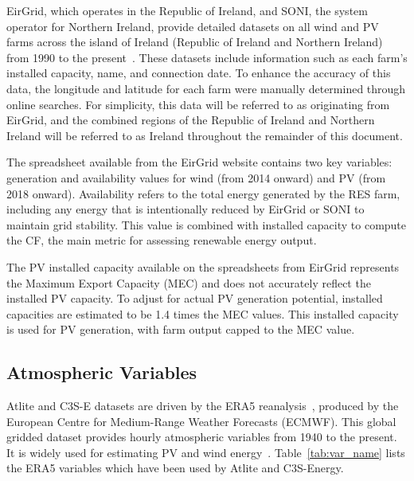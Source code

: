 \documentclass[a4paper, 11pt]{article}
\begin{document}
EirGrid, which operates in the Republic of Ireland, and SONI, the system operator for Northern Ireland, provide detailed datasets on all wind and PV farms across the island of Ireland (Republic of Ireland and Northern Ireland) from 1990 to the present~\cite{eirgrid}. These datasets include information such as each farm’s installed capacity, name, and connection date. To enhance the accuracy of this data, the longitude and latitude for each farm were manually determined through online searches. For simplicity, this data will be referred to as originating from EirGrid, and the combined regions of the Republic of Ireland and Northern Ireland will be referred to as Ireland throughout the remainder of this document.

The spreadsheet available from the EirGrid website contains two key variables: generation and availability values for wind (from 2014 onward) and PV (from 2018 onward). Availability refers to the total energy generated by the RES farm, including any energy that is intentionally reduced by EirGrid or SONI to maintain grid stability. This value is combined with installed capacity to compute the CF, the main metric for assessing renewable energy output.

The PV installed capacity available on the spreadsheets from EirGrid represents the Maximum Export Capacity (MEC) and does not accurately reflect the installed PV capacity. To adjust for actual PV generation potential, installed capacities are estimated to be 1.4 times the MEC values. This installed capacity is used for PV generation, with farm output capped to the MEC value.

\subsection{Atmospheric Variables}
\label{sec:era5}
 
Atlite and C3S-E datasets are driven by the ERA5 reanalysis~\cite{hersbach2020era5}, produced by the European Centre for Medium-Range Weather Forecasts (ECMWF). This global gridded dataset provides hourly atmospheric variables from 1940 to the present. It is widely used for estimating PV and wind energy~\cite{mockert2023drought, dubus2023energy, brown2021drought, otero2022drought}. Table~\ref{tab:var_name} lists the ERA5 variables which have been used by Atlite and C3S-Energy.
\end{document}
